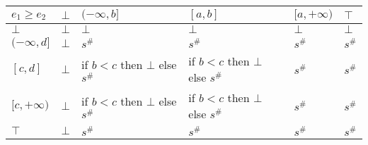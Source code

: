\documentclass{article}
\begin{document}
        \begin{table}[]
            \begin{tabular}{|l|l|l|l|l|l|}
            \hline
            $e_1 \ge e_2$  & $\bot$ & $(-\infty, b]$                     & $[a, b]$                           & $[a, +\infty)$ & $\top$ \\ \hline
            $\bot$         & $\bot$ & $\bot$                             & $\bot$                             & $\bot$         & $\bot$ \\ \hline
            $(-\infty, d]$ & $\bot$ & $s^\#$                             & $s^\#$                             & $s^\#$         & $s^\#$ \\ \hline
            $[c, d]$       & $\bot$ & if $b < c$ then $\bot$ else $s^\#$ & if $b < c$ then $\bot$ else $s^\#$ & $s^\#$         & $s^\#$ \\ \hline
            $[c, +\infty)$ & $\bot$ & if $b < c$ then $\bot$ else $s^\#$ & if $b < c$ then $\bot$ else $s^\#$ & $s^\#$         & $s^\#$ \\ \hline
            $\top$         & $\bot$ & $s^\#$                             & $s^\#$                             & $s^\#$         & $s^\#$ \\ \hline
            \end{tabular}
            \end{table}
\end{document}

